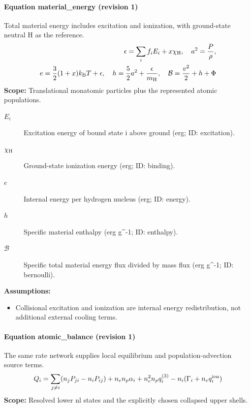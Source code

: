 \paragraph{Equation material\_energy (revision 1)}
Total material energy includes excitation and ionization, with ground-state neutral H as the reference.
\begin{equation}
\begin{aligned}
\epsilon=\sum_i f_i E_i+x\chi_{\rm H},\quad a^2=\frac{P}{\rho},\\e=\frac32(1+x)k_{\rm B}T+\epsilon,\quad h=\frac52a^2+\frac{\epsilon}{m_{\rm H}},\quad \mathcal B=\frac{v^2}{2}+h+\Phi
\end{aligned}
\label{eq:escape.coupled_5f_hydrogen:material_5f_energy:1}
\end{equation}
\noindent\textbf{Scope:} Translational monatomic particles plus the represented atomic populations.

\begin{description}
\item[$E_i$] Excitation energy of bound state i above ground (erg; ID: excitation).
\item[$\chi_{\rm H}$] Ground-state ionization energy (erg; ID: binding).
\item[$e$] Internal energy per hydrogen nucleus (erg; ID: energy).
\item[$h$] Specific material enthalpy (erg g\textasciicircum{}-1; ID: enthalpy).
\item[$\mathcal B$] Specific total material energy flux divided by mass flux (erg g\textasciicircum{}-1; ID: bernoulli).
\end{description}

\noindent\textbf{Assumptions:}
\begin{itemize}
\item Collisional excitation and ionization are internal energy redistribution, not additional external cooling terms.
\end{itemize}

\paragraph{Equation atomic\_balance (revision 1)}
The same rate network supplies local equilibrium and population-advection source terms.
\begin{equation}
\begin{aligned}
Q_i=\sum_{j\ne i}(n_jP_{ji}-n_iP_{ij})+n_en_p\alpha_i+n_e^2n_pq_i^{(3)}-n_i(\Gamma_i+n_eq_i^{\rm ion})
\end{aligned}
\label{eq:escape.coupled_5f_hydrogen:atomic_5f_balance:1}
\end{equation}
\noindent\textbf{Scope:} Resolved lower nl states and the explicitly chosen collapsed upper shells.

